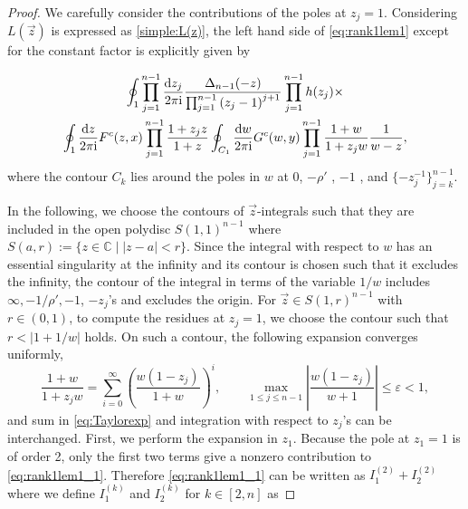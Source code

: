 \documentclass[cmp]{svjour}
\numberwithin{theorem}{section}
\numberwithin{equation}{section}
\def\dd{{\rm d}}
\def\ii{{\rm i}}
\def\be{\begin{equation}}
\def\ee{\end{equation}}
\begin{document}
\begin{proof}

We carefully consider the contributions of the poles at $z_j=1$. Considering $L(\vec{z})$ is expressed as \eqref{simple:L(z)}, the left hand side of \eqref{eq:rank1lem1} except for the constant factor is explicitly given by 

\begin{multline}
\label{eq:rank1lem1_1}
 \oint_{1} \prod_{j=1}^{n-1}{ \frac{\dd z_j}{2 \pi \ii} } \frac{ \Delta_{n-1}(-z)}{ \prod_{j=1}^{n-1}{{(z_j -1)}^{j+1}} } \prod_{j=1}^{n-1}{h(z_j)} \times \\
  \oint_{1} \frac{\dd z}{2 \pi \ii} F^c(z , x) \prod_{j=1}^{n-1}{ \frac{1 + z_j z}{1 + z} } \oint_{C_1} \frac{\dd w}{2 \pi \ii} G^c(w , y) \prod_{j=1}^{n-1}{\frac{1 + w}{1 + z_j w}} \frac{1}{w-z},
\end{multline}
where the contour $C_k$ lies around the poles in $w$ at 0, $ - \rho'$ , $ -1$ , and $ \{ - z_j^{-1} \}_{j=k}^{n-1}$.

In the following, we choose the contours of $\vec{z}$-integrals such that they are included in the open polydisc ${S(1,1)}^{n-1}$ where $S(a,r) := \{ z \in \mathbb{C} \mid |z - a| < r \}$.
Since the integral with respect to $w$ has an essential singularity at the infinity and its contour is chosen such that it excludes the infinity, the contour of the integral in terms of the variable $1/w$ includes $\infty, -1/\rho', -1$, $-z_j$'s and excludes the origin. 
For $\vec{z} \in S(1,r)^{n-1}$ with $r \in (0,1)$, to compute the residues at $z_j=1$, we choose the contour such that $r < |1+1/w|$ holds. On such a contour, the following expansion converges uniformly,
\be
\label{eq:Taylorexp}
\frac{1 + w}{1 + z_j w} = \sum_{i=0}^{\infty}{ {\left( \frac{w(1 - z_j)}{1 + w} \right)}^i },  \qquad \underset{1 \leq j \leq n-1}{ \max}  \left| \frac{w (1 -z_j)}{w +1} \right|  \le \varepsilon < 1 ,
\ee
and sum in \eqref{eq:Taylorexp} and integration with respect to $z_j$'s can be interchanged.
First, we perform the expansion in $z_1$.  Because the pole at $z_1=1$ is of order 2, only the first two terms give a nonzero contribution to \eqref{eq:rank1lem1_1}. Therefore \eqref{eq:rank1lem1_1} can be written as $I_1^{(2)} + I_2^{(2)}$ where we define $I_1^{(k)}$ and $I_2^{(k)}$ for $ k \in [2, n] $ as


\end{proof}
\end{document}
